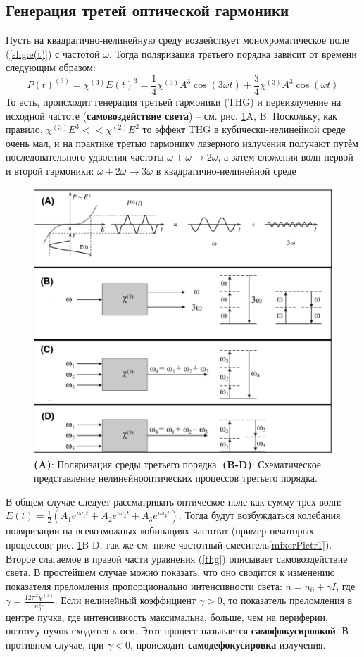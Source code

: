 \subsection*{Генерация третей оптической гармоники} 
Пусть на квадратично-нелинейную среду воздействует монохроматическое поле (\ref{shg:e(t)}) с частотой $\omega$. Тогда поляризация третьего порядка зависит от времени следующим образом:
\begin{equation}\label{thg}
P(t)^{(3)} = \chi^{(3)}E(t)^3 = \frac{1}{4}\chi^{(3)}A^3\cos(3\omega t) + \frac{3}{4}\chi^{(3)}A^3\cos(\omega t)
\end{equation}
То есть, происходит генерация третьей гармоники (THG) и переизлучение на исходной частоте (\textbf{самовоздействие света}) – см. рис. \ref{thg1}A, B. Поскольку, как правило, $\chi^{(3)}E^3 << \chi^{(2)}E^2$ то эффект THG в кубически-нелинейной среде очень мал, и на практике третью гармонику лазерного излучения получают путѐм последовательного удвоения частоты $\omega +  \omega \rightarrow 2\omega$, а затем сложения волн первой и второй гармоники: $\omega +  2\omega \rightarrow 3\omega$ в квадратично-нелинейной среде
\begin{figure}[h]
	\centering
	\includegraphics[width=0.8\linewidth]{images/thg.png}
	\caption{\textbf{(A)}: Поляризация среды третьего порядка. \textbf{(B-D)}: Схематическое представление нелинейнооптических процессов третьего порядка.}
	\label{thg1}
\end{figure}
В общем случае следует рассматривать оптическое поле как сумму трех волн: $E(t) = \frac{1}{2}(A_1e^{i\omega_1 t} + A_2e^{i\omega_2 t} + A_3e^{i\omega_3 t})$. Тогда будут возбуждаться колебания поляризации на всевозможных кобинациях частотат (пример некоторых процессовт рис. \ref{thg1}B-D, так-же см. ниже частотный смеситель\ref{mixerPictr1}). Второе слагаемое в правой части уравнения (\ref{thg}) описывает самовоздействие света. В простейшем случае можно показать, что оно сводится к изменению показателя преломления пропорционально интенсивности света: $n = n_0 + \gamma I$, где $ \gamma = \frac{12\pi^2 \chi^{(3)}}{n_{0}^{2}c} $. Если нелинейный коэффициент $\gamma > 0$, то показатель преломления в центре пучка, где интенсивность максимальна, больше, чем на периферии, поэтому пучок сходится к оси. Этот процесс называется \textbf{самофокусировкой}. В противном случае, при $\gamma < 0$, происходит \textbf{самодефокусировка} излучения. 